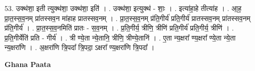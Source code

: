 \documentclass[17pt]{extarticle}
\begin{document}
53. उक्थ॑शा॒ इती त्युक्थ॑शा॒ उक्थ॑शा॒ इति॑ । . उक्थ॑शा॒ इत्युक्थ॑ - शाः॒ । . इत्या॑हा॒हे तीत्या॑ह । . आ॒ह॒ प्रा॒त॒स्स॒व॒नम् प्रा॑तस्सव॒न मा॑हाह प्रातस्सव॒नम् । . प्रा॒त॒स्स॒व॒नम् प्र॑ति॒गीर्य॑ प्रति॒गीर्य॑ प्रातस्सव॒नम् प्रा॑तस्सव॒नम् प्र॑ति॒गीर्य॑ । . प्रा॒त॒स्स॒व॒नमिति॑ प्रातः - स॒व॒नम् । . प्र॒ति॒गीर्य॒ त्रीणि॒ त्रीणि॑ प्रति॒गीर्य॑ प्रति॒गीर्य॒ त्रीणि॑ । . प्र॒ति॒गीर्येति॑ प्रति - गीर्य॑ । . त्री ण्ये॒ता न्ये॒तानि॒ त्रीणि॒ त्रीण्ये॒तानि॑ । . ए॒ता न्य॒क्षरा᳚ ण्य॒क्षरा᳚ ण्ये॒ता न्ये॒ता न्य॒क्षरा॑णि । . अ॒क्षरा॑णि त्रि॒पदा᳚ त्रि॒पदा॒ ऽक्षरा᳚ ण्य॒क्षरा॑णि त्रि॒पदा᳚ । \newline

\textbf{Ghana Paata } \newline
\end{document}
